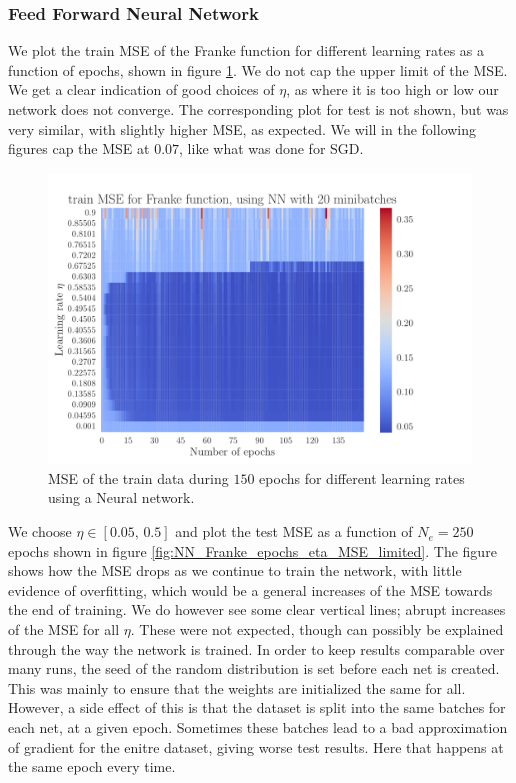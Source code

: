 \documentclass[12pt]{extarticle}
\begin{document}
\subsubsection{Feed Forward Neural Network}

We plot the train MSE of the Franke function for different learning rates as a function of epochs, shown in figure \ref{fig:NN_Franke_epochs_eta_MSE}. We do not cap the upper limit of the MSE. We get a clear indication of good choices of $\eta$, as where it is too high or low our network does not converge. The corresponding plot for test is not shown, but was very similar, with slightly higher MSE, as expected. We will in the following figures cap the MSE at $0.07$, like what was done for SGD.

\begin{figure}[h!]
	\includegraphics[width=\linewidth]{NN_Franke/NN_Franke__epochs_eta__train_MSE__569887.pdf}
	\caption{MSE of the train data during $150$ epochs for different learning rates using a Neural network.}
	\label{fig:NN_Franke_epochs_eta_MSE}
\end{figure}


We choose $\eta\in[0.05,\,0.5]$ and plot the test MSE as a function of $N_e=250$ epochs shown in figure \ref{fig:NN_Franke_epochs_eta_MSE_limited}. The figure shows how the MSE drops as we continue to train the network, with little evidence of overfitting, which would be a general increases of the MSE towards the end of training. We do however see some clear vertical lines; abrupt increases of the MSE for all $\eta$. These were not expected, though can possibly be explained through the way the network is trained. In order to keep results comparable over many runs, the seed of the random distribution is set before each net is created. This was mainly to ensure that the weights are initialized the same for all. However, a side effect of this is that the dataset is split into the same batches for each net, at a given epoch. Sometimes these batches lead to a bad approximation of gradient for the enitre dataset, giving worse test results. Here that happens at the same epoch every time.
\end{document}
